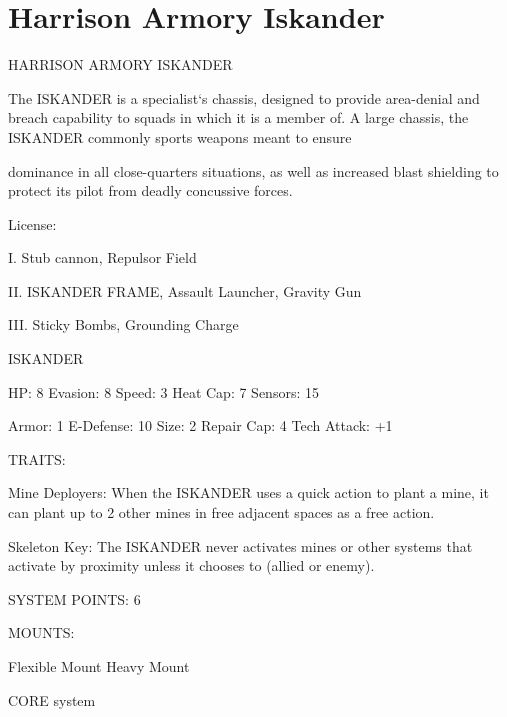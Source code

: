 \section{Harrison Armory Iskander}

                              HARRISON ARMORY ISKANDER  

The ISKANDER is a specialist‘s chassis, designed to provide area-denial and breach capability to squads in  
which it is a member of. A large chassis, the ISKANDER commonly sports weapons meant to ensure  

dominance in all close-quarters situations, as well as increased blast shielding to protect its pilot from  
deadly concussive forces. 
 
                                                   License:
 
I. Stub cannon, Repulsor Field
 
II. ISKANDER FRAME, Assault Launcher, Gravity Gun
 
III. Sticky Bombs, Grounding Charge
 

                                                ISKANDER 

 HP: 8          Evasion: 8                            Speed: 3           Heat Cap: 7        Sensors: 15 

 Armor: 1       E-Defense: 10                         Size: 2            Repair Cap: 4      Tech Attack:  
                                                                                            +1 

                                                  TRAITS: 

 Mine Deployers: When the ISKANDER uses a quick action to plant a mine, it can plant up to 2 other  
 mines in free adjacent spaces as a free action.
 
 Skeleton Key: The ISKANDER never activates mines or other systems that activate by proximity unless  
 it chooses to (allied or enemy). 

                                            SYSTEM POINTS: 6 

                                                  MOUNTS: 

 Flexible Mount                    Heavy Mount 

                                               CORE system 

                                                                                                            


